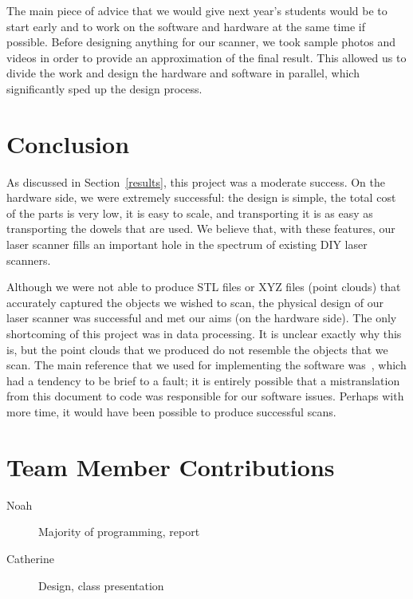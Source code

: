 \documentclass[12pt, letterpaper]{article}
\begin{document}
The main piece of advice that we would give next year's students would be to start
early and to work on the software and hardware at the same time if possible. Before
designing anything for our scanner, we took sample photos and videos in order to
provide an approximation of the final result. This allowed us to divide the work
and design the hardware and software in parallel, which significantly sped up the
design process.

\section{Conclusion}

As discussed in Section~\ref{results}, this project was a moderate success.
On the hardware side, we were extremely successful: the design is simple,
the total cost of the parts is very low, it is easy to scale, and transporting
it is as easy as transporting the dowels that are used. We believe that, with
these features, our laser scanner fills an important hole in the spectrum of
existing DIY laser scanners.

Although we were not able to produce STL files or XYZ files (point clouds) that
accurately captured the objects we wished to scan, the physical design of our
laser scanner was successful and met our aims (on the hardware side).
The only shortcoming of this project was in data processing. It is unclear exactly
why this is, but the point clouds that we produced do not resemble the objects that
we scan.  The main reference that we used for implementing the software
was~\cite{instructions}, which had a tendency to be brief to a fault; it is entirely
possible that a mistranslation from this document to code was responsible for our software
issues.  Perhaps with more time, it would have been possible to produce successful scans.

 

\section{Team Member Contributions}
\begin{description}
    \item[Noah] Majority of programming, report
    \item[Catherine] Design, class presentation
\end{description}
\end{document}
